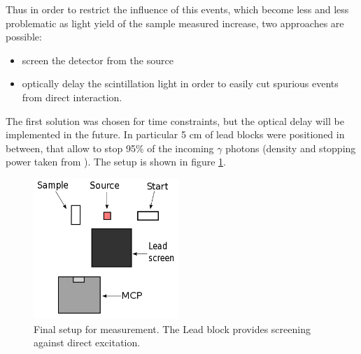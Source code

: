 Thus in order to restrict the influence of this events, which become less and less problematic as light yield of the sample measured increase, two approaches are possible:
\begin{itemize}
\item screen the detector from the source
\item optically delay the scintillation light in order to easily cut spurious events from direct interaction.
\end{itemize}
The first solution was chosen for time constraints, but the optical delay will be implemented in the future. In particular 5 cm of lead blocks were positioned in between, that allow to stop 95$\%$ of the incoming $\gamma$ photons (density and stopping power taken from \cite{nist2005}). The setup is shown in figure \ref{fig:twist3}.
\begin{figure}
\begin{center}
\includegraphics[width=5.5cm]{../Pictures/Chapter_8/setup_twist.png}
\end{center}
\caption[Background suppressed setup]{Final setup for measurement. The Lead block provides screening against direct excitation.}
\label{fig:twist3}
\end{figure}

